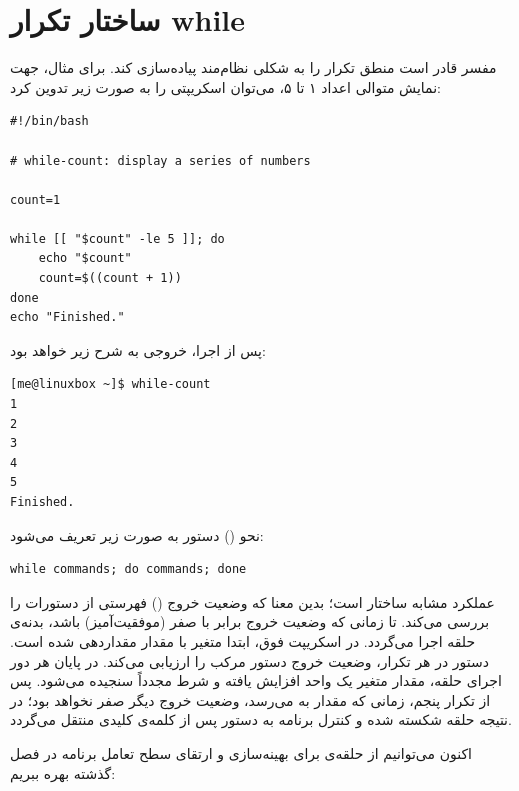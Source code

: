 \section{ساختار تکرار while}

مفسر  قادر است منطق تکرار را به شکلی نظام‌مند پیاده‌سازی کند. برای مثال، جهت نمایش متوالی اعداد ۱ تا ۵، می‌توان اسکریپتی را به صورت زیر تدوین کرد:

\begin{latin}
\begin{lstlisting}
#!/bin/bash

# while-count: display a series of numbers

count=1

while [[ "$count" -le 5 ]]; do
    echo "$count"
    count=$((count + 1))
done
echo "Finished."
\end{lstlisting}
\end{latin}

پس از اجرا، خروجی به شرح زیر خواهد بود:

\begin{latin}
\begin{lstlisting}
[me@linuxbox ~]$ while-count
1
2
3
4
5
Finished.
\end{lstlisting}
\end{latin}

نحو () دستور  به صورت زیر تعریف می‌شود:

\begin{latin}
\begin{lstlisting}
while commands; do commands; done
\end{lstlisting}
\end{latin}

عملکرد  مشابه ساختار  است؛ بدین معنا که وضعیت خروج () فهرستی از دستورات را بررسی می‌کند. تا زمانی که وضعیت خروج برابر با صفر (موفقیت‌آمیز) باشد، بدنه‌ی حلقه اجرا می‌گردد. در اسکریپت فوق، ابتدا متغیر  با مقدار  مقداردهی شده است. دستور  در هر تکرار، وضعیت خروج دستور مرکب \cmd{[[ ]]} را ارزیابی می‌کند. در پایان هر دور اجرای حلقه، مقدار متغیر یک واحد افزایش یافته و شرط مجدداً سنجیده می‌شود. پس از تکرار پنجم، زمانی که مقدار  به  می‌رسد، وضعیت خروج دیگر صفر نخواهد بود؛ در نتیجه حلقه شکسته شده و کنترل برنامه به دستور پس از کلمه‌ی کلیدی  منتقل می‌گردد.

اکنون می‌توانیم از حلقه‌ی  برای بهینه‌سازی و ارتقای سطح تعامل برنامه  در فصل گذشته بهره ببریم:

